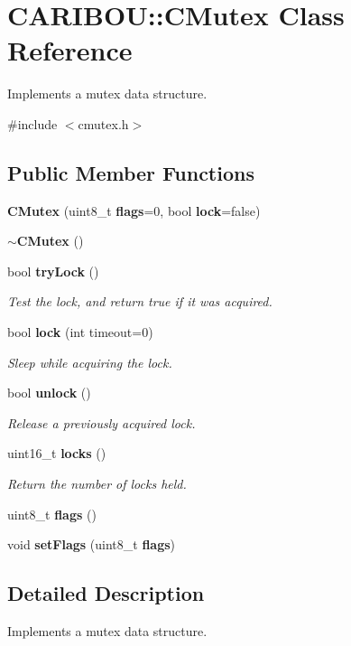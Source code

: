 \section{C\+A\+R\+I\+B\+OU\+:\+:C\+Mutex Class Reference}
\label{class_c_a_r_i_b_o_u_1_1_c_mutex}


Implements a mutex data structure.  




{\ttfamily \#include $<$cmutex.\+h$>$}

\subsection*{Public Member Functions}
\begin{DoxyCompactItemize}
\item 
{\bf C\+Mutex} (uint8\+\_\+t {\bf flags}=0, bool {\bf lock}=false)
\item 
{\bf $\sim$\+C\+Mutex} ()
\item 
bool {\bf try\+Lock} ()
\begin{DoxyCompactList}\small\item\em Test the lock, and return true if it was acquired. \end{DoxyCompactList}\item 
bool {\bf lock} (int timeout=0)
\begin{DoxyCompactList}\small\item\em Sleep while acquiring the lock. \end{DoxyCompactList}\item 
bool {\bf unlock} ()
\begin{DoxyCompactList}\small\item\em Release a previously acquired lock. \end{DoxyCompactList}\item 
uint16\+\_\+t {\bf locks} ()
\begin{DoxyCompactList}\small\item\em Return the number of locks held. \end{DoxyCompactList}\item 
uint8\+\_\+t {\bf flags} ()
\item 
void {\bf set\+Flags} (uint8\+\_\+t {\bf flags})
\end{DoxyCompactItemize}


\subsection{Detailed Description}
Implements a mutex data structure. 

